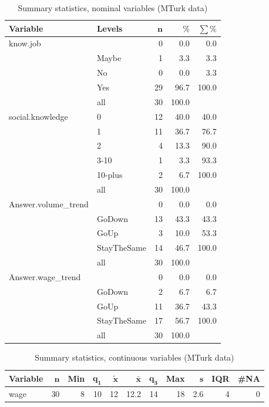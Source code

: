 \documentclass[a4paper,10pt]{article}\usepackage[]{graphicx}\usepackage[]{color}
\begin{document}
\begin{table}[ht]
\centering
{\footnotesize
\begin{tabular}{ll|rrr}
 \textbf{Variable} & \textbf{Levels} & $\mathbf{n}$ & $\mathbf{\%}$ & $\mathbf{\sum \%}$ \\ 
  \hline
know.job &  & 0 & 0.0 & 0.0 \\ 
   & Maybe & 1 & 3.3 & 3.3 \\ 
   & No & 0 & 0.0 & 3.3 \\ 
   & Yes & 29 & 96.7 & 100.0 \\ 
   \hline
 & all & 30 & 100.0 &  \\ 
   \hline
\hline
social.knowledge & 0 & 12 & 40.0 & 40.0 \\ 
   & 1 & 11 & 36.7 & 76.7 \\ 
   & 2 & 4 & 13.3 & 90.0 \\ 
   & 3-10 & 1 & 3.3 & 93.3 \\ 
   & 10-plus & 2 & 6.7 & 100.0 \\ 
   \hline
 & all & 30 & 100.0 &  \\ 
   \hline
\hline
Answer.volume\_trend &  & 0 & 0.0 & 0.0 \\ 
   & GoDown & 13 & 43.3 & 43.3 \\ 
   & GoUp & 3 & 10.0 & 53.3 \\ 
   & StayTheSame & 14 & 46.7 & 100.0 \\ 
   \hline
 & all & 30 & 100.0 &  \\ 
   \hline
\hline
Answer.wage\_trend &  & 0 & 0.0 & 0.0 \\ 
   & GoDown & 2 & 6.7 & 6.7 \\ 
   & GoUp & 11 & 36.7 & 43.3 \\ 
   & StayTheSame & 17 & 56.7 & 100.0 \\ 
   \hline
 & all & 30 & 100.0 &  \\ 
   \hline
\hline
\end{tabular}
}
\caption{Summary statistics, nominal variables (MTurk data)} 
\label{tab1:43-3070}
\end{table}
\begin{table}[ht]
\centering
{\footnotesize
\begin{tabular}{lrrrrrrrrrr}
 \textbf{Variable} & $\mathbf{n}$ & \textbf{Min} & $\mathbf{q_1}$ & $\mathbf{\widetilde{x}}$ & $\mathbf{\bar{x}}$ & $\mathbf{q_3}$ & \textbf{Max} & $\mathbf{s}$ & \textbf{IQR} & \textbf{\#NA} \\ 
  \hline
wage & 30 & 8 & 10 & 12 & 12.2 & 14 & 18 & 2.6 & 4 & 0 \\ 
  \end{tabular}
}
\caption{Summary statistics, continuous variables (MTurk data)} 
\label{tab2:43-3070}
\end{table}
\end{document}
